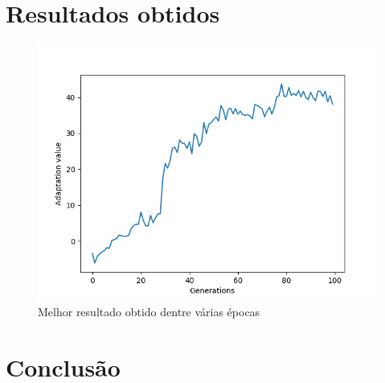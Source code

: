 \documentclass[article, a4paper, 12pt]{article}
\begin{document}
\section{Resultados obtidos}

\begin{figure}[!htb]
     \centering
     \includegraphics[scale=0.75]{img/melhor.png}
     \caption{Melhor resultado obtido dentre várias épocas}
     \label{fig:melhor}
\end{figure}

\section{Conclusão}
\end{document}
